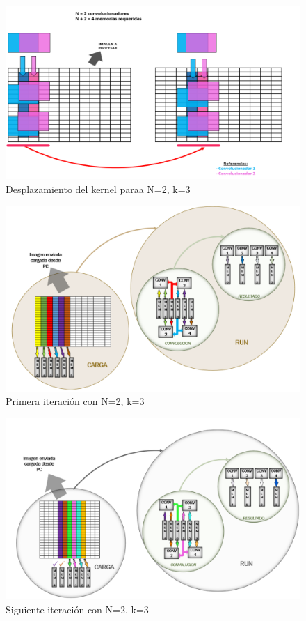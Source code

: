 \documentclass[]{IEEEphot}
\begin{document}
\begin{figure}[H]
\centering
\includegraphics[scale=0.75]{conv2_despl.png}
\caption{Desplazamiento del kernel paraa N=2, k=3 }
\label{writingprocess2}
\end{figure}

\begin{figure}[H]
\centering
\includegraphics[scale=0.7]{example_1}
\caption{Primera iteración con N=2, k=3 }
\label{writingprocess3}
\end{figure}


\begin{figure}[H]
\centering
\includegraphics[scale=0.7]{example_2}
\caption{Siguiente iteración con N=2, k=3}
\label{writingprocess4}
\end{figure}
\end{document}
